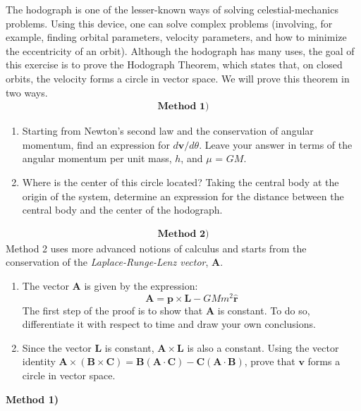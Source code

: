 \documentclass[11pt]{article}
\begin{document}
\begin{pproblem}
    The hodograph is one of the lesser-known ways of solving celestial-mechanics problems. Using this device, one can solve complex problems (involving, for example, finding orbital parameters, velocity parameters, and how to minimize the eccentricity of an orbit). Although the hodograph has many uses, the goal of this exercise is to prove the Hodograph Theorem, which states that, on closed orbits, the velocity forms a circle in vector space. We will prove this theorem in two ways.
    \begin{align*}
    \textbf{Method 1)}
    \end{align*}
    \begin{enumerate}[label=\textbf{\Roman*.}]
        \item Starting from Newton's second law and the conservation of angular momentum, find an expression for \(d\mathbf{v}/d\theta\). Leave your answer in terms of the angular momentum per unit mass, \(h\), and \(\mu\) = \(GM\). 
        \item Where is the center of this circle located? Taking the central body at the origin of the system, determine an expression for the distance between the central body and the center of the hodograph. 
    \end{enumerate}
    
    \begin{align*}
        \textbf{Method 2)}
    \end{align*}
    Method 2 uses more advanced notions of calculus and starts from the conservation of the \textit{Laplace-Runge-Lenz vector}, \(\mathbf{A}\).
    \begin{enumerate}[label=\textbf{\Roman*.}]
        \item The vector \(\mathbf{A}\) is given by the expression:
        \[
        \mathbf{A} = \mathbf{p}\times \mathbf{L} - GMm^2\mathbf{\hat{r}}
        \]
        The first step of the proof is to show that \(\mathbf{A}\) is constant. To do so, differentiate it with respect to time and draw your own conclusions.
        \item Since the vector \(\mathbf{L}\) is constant, \(\mathbf{A}\times\mathbf{L}\) is also a constant. Using the vector identity \(\mathbf{A}\times(\mathbf{B}\times\mathbf{C}) = \mathbf{B}(\mathbf{A}\cdot\mathbf{C}) - \mathbf{C}(\mathbf{A}\cdot\mathbf{B}) \), prove that \(\mathbf{v}\) forms a circle in vector space.    
    \end{enumerate}
    \begin{pssolution*}{}{}
        \textbf{Method 1)}


\end{pssolution*}
\end{pproblem}
\end{document}
